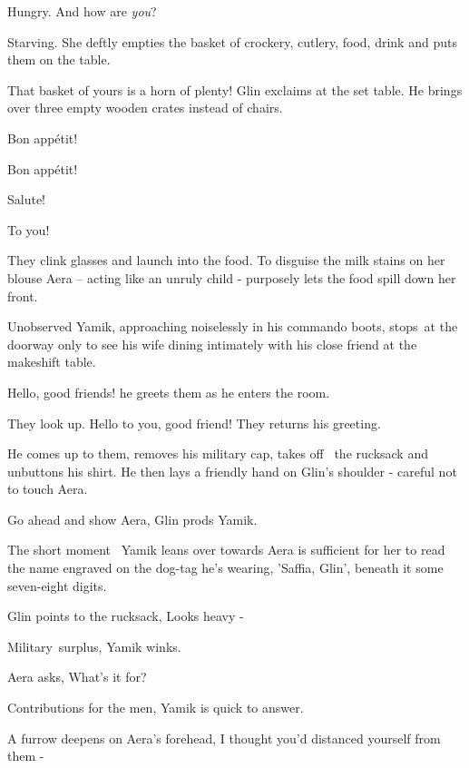 \documentclass[letterpaper]{article}
\begin{document}
{\textquotedbl}Hungry. And how are \textit{you}?{\textquotedbl} 

{\textquotedbl}Starving.{\textquotedbl} She deftly empties the basket of crockery, cutlery, food, drink and puts them on
the table. 

{\textquotedbl}That basket of yours is a horn of plenty!{\textquotedbl} Glin exclaims at the set table. He brings over
three empty wooden crates instead of chairs. 

{\textquotedbl}Bon app\'etit!{\textquotedbl} 

{\textquotedbl}Bon app\'etit!{\textquotedbl} 

{\textquotedbl}Salute!{\textquotedbl} 

{\textquotedbl}To you!{\textquotedbl} 

They clink glasses and launch into the food. To disguise the milk stains on her blouse Aera -- acting like an unruly
child - purposely lets the food spill down her front.

Unobserved Yamik, approaching noiselessly in his commando boots, stops~at the doorway only to see his wife dining
intimately with his close friend at the makeshift table. 

{\textquotedbl}Hello, good friends!{\textquotedbl} he greets them as he enters the room. ~

They look up. {\textquotedbl}Hello to you,{ }good{ }friend!{\textquotedbl} They returns
his greeting.

He comes up to them, removes{ }his military cap, takes off \ the rucksack and
unbuttons his shirt. He then lays a friendly hand on Glin's shoulder - careful not to touch Aera.

{\textquotedbl}Go ahead and show Aera,{\textquotedbl} Glin prods Yamik. 

The short moment \ Yamik leans over towards Aera is sufficient for her to read the name engraved on the
dog{{}-}tag he's wearing, 'Saffia, Glin', beneath it some seven-eight digits. 

Glin points to the rucksack, {\textquotedbl}Looks heavy -{\textquotedbl}~ 

{\textquotedbl}Military~surplus,{\textquotedbl} Yamik winks. 

Aera asks, {\textquotedbl}What's it for?{\textquotedbl} 

{\textquotedbl}Contributions for the men,{\textquotedbl} Yamik is quick to answer. 

A furrow deepens on Aera's forehead, {\textquotedbl}I thought you'd distanced yourself from them -{\textquotedbl} 
\end{document}
